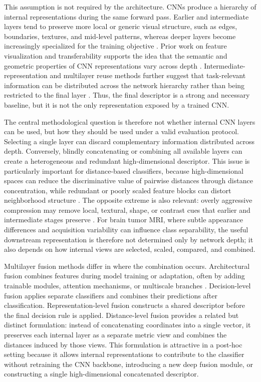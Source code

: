 \documentclass[main.tex]{subfiles}
\begin{document}
This assumption is not required by the architecture. CNNs produce a hierarchy of internal representations during the same forward pass. Earlier and intermediate layers tend to preserve more local or generic visual structure, such as edges, boundaries, textures, and mid-level patterns, whereas deeper layers become increasingly specialized for the training objective \cite{zeiler2014visualizing,yosinski2014transferable}. Prior work on feature visualization and transferability supports the idea that the semantic and geometric properties of CNN representations vary across depth \cite{zeiler2014visualizing,yosinski2014transferable}. Intermediate-representation and multilayer reuse methods further suggest that task-relevant information can be distributed across the network hierarchy rather than being restricted to the final layer \cite{fradi2021multilayer,gomes2023fmlf,evci2022head2toe}. Thus, the final descriptor is a strong and necessary baseline, but it is not the only representation exposed by a trained CNN.

The central methodological question is therefore not whether internal CNN layers can be used, but how they should be used under a valid evaluation protocol. Selecting a single layer can discard complementary information distributed across depth. Conversely, blindly concatenating or combining all available layers can create a heterogeneous and redundant high-dimensional descriptor. This issue is particularly important for distance-based classifiers, because high-dimensional spaces can reduce the discriminative value of pairwise distances through distance concentration, while redundant or poorly scaled feature blocks can distort neighborhood structure \cite{beyer1997nearest}. The opposite extreme is also relevant: overly aggressive compression may remove local, textural, shape, or contrast cues that earlier and intermediate stages preserve \cite{zeiler2014visualizing,yosinski2014transferable}. For brain tumor MRI, where subtle appearance differences and acquisition variability can influence class separability, the useful downstream representation is therefore not determined only by network depth; it also depends on how internal views are selected, scaled, compared, and combined.

Multilayer fusion methods differ in where the combination occurs. Architectural fusion combines features during model training or adaptation, often by adding trainable modules, attention mechanisms, or multiscale branches \cite{dai2020aff,he2025hemf,zhang2025context}. Decision-level fusion applies separate classifiers and combines their predictions after classification. Representation-level fusion constructs a shared descriptor before the final decision rule is applied. Distance-level fusion provides a related but distinct formulation: instead of concatenating coordinates into a single vector, it preserves each internal layer as a separate metric view and combines the distances induced by those views. This formulation is attractive in a post-hoc setting because it allows internal representations to contribute to the classifier without retraining the CNN backbone, introducing a new deep fusion module, or constructing a single high-dimensional concatenated descriptor.
\end{document}
